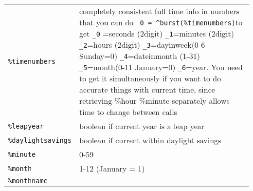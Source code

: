 \documentclass[]{article}
\begin{document}
\begin{longtable}[]{@{}ll@{}}
\begin{minipage}[t]{0.12\columnwidth}\raggedright\strut
\texttt{\%timenumbers}\strut
\end{minipage} & \begin{minipage}[t]{0.61\columnwidth}\raggedright\strut
completely consistent full time info in numbers that you can do
\texttt{\_0\ =\ \^{}burst(\%timenumbers)}to get \texttt{\_0} =seconds
(2digit) \texttt{\_1}=minutes (2digit) \texttt{\_2}=hours (2digit)
\texttt{\_3}=dayinweek(0-6 Sunday=0) \texttt{\_4}=dateinmonth (1-31)
\texttt{\_5}=month(0-11 January=0) \texttt{\_6}=year. You need to get it
simultaneously if you want to do accurate things with current time,
since retrieving \%hour \%minute separately allows time to change
between calls\strut
\end{minipage}\tabularnewline
\begin{minipage}[t]{0.12\columnwidth}\raggedright\strut
\texttt{\%leapyear}\strut
\end{minipage} & \begin{minipage}[t]{0.61\columnwidth}\raggedright\strut
boolean if current year is a leap year\strut
\end{minipage}\tabularnewline
\begin{minipage}[t]{0.12\columnwidth}\raggedright\strut
\texttt{\%daylightsavings}\strut
\end{minipage} & \begin{minipage}[t]{0.61\columnwidth}\raggedright\strut
boolean if current within daylight savings\strut
\end{minipage}\tabularnewline
\begin{minipage}[t]{0.12\columnwidth}\raggedright\strut
\texttt{\%minute}\strut
\end{minipage} & \begin{minipage}[t]{0.61\columnwidth}\raggedright\strut
0-59\strut
\end{minipage}\tabularnewline
\begin{minipage}[t]{0.12\columnwidth}\raggedright\strut
\texttt{\%month}\strut
\end{minipage} & \begin{minipage}[t]{0.61\columnwidth}\raggedright\strut
1-12 (January = 1)\strut
\end{minipage}\tabularnewline
\begin{minipage}[t]{0.12\columnwidth}\raggedright\strut
\texttt{\%monthname}\strut
\end{minipage} & \begin{minipage}[t]{0.61\columnwidth}\raggedright\strut

\end{minipage}
\end{longtable}
\end{document}
